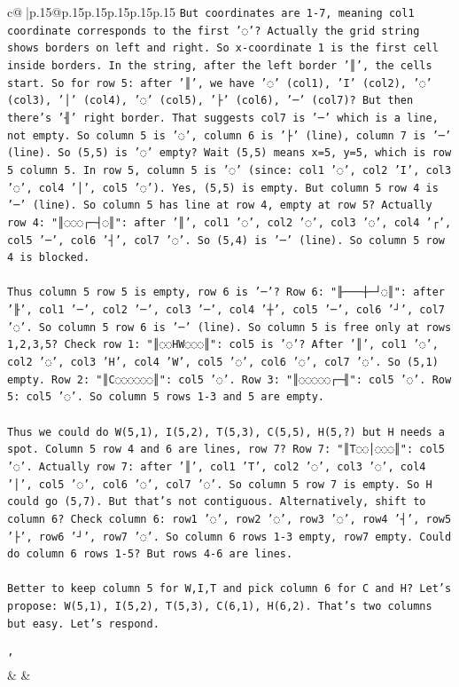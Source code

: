 \documentclass{article}
\begin{document}
{\begin{supertabular}{c@{$\;$}|p{.15\linewidth}@{}p{.15\linewidth}p{.15\linewidth}p{.15\linewidth}p{.15\linewidth}p{.15\linewidth}}
{{{\texttt{But coordinates are 1{-}7, meaning col1 coordinate corresponds to the first '◌'? Actually the grid string shows borders on left and right. So x{-}coordinate 1 is the first cell inside borders. In the string, after the left border '║', the cells start. So for row 5: after '║', we have '◌' (col1), 'I' (col2), '◌' (col3), '│' (col4), '◌' (col5), '├' (col6), '─' (col7)? But then there's '╢' right border. That suggests col7 is '─' which is a line, not empty. So column 5 is '◌', column 6 is '├' (line), column 7 is '─' (line). So (5,5) is '◌' empty? Wait (5,5) means x=5, y=5, which is row 5 column 5. In row 5, column 5 is '◌' (since: col1 '◌', col2 'I', col3 '◌', col4 '│', col5 '◌'). Yes, (5,5) is empty. But column 5 row 4 is '─' (line). So column 5 has line at row 4, empty at row 5? Actually row 4: "║◌◌◌┌─┤◌║": after '║', col1 '◌', col2 '◌', col3 '◌', col4 '┌', col5 '─', col6 '┤', col7 '◌'. So (5,4) is '─' (line). So column 5 row 4 is blocked.} \\
\\ 
\texttt{Thus column 5 row 5 is empty, row 6 is '─'? Row 6: "╟───┼─┘◌║": after '╟', col1 '─', col2 '─', col3 '─', col4 '┼', col5 '─', col6 '┘', col7 '◌'. So column 5 row 6 is '─' (line). So column 5 is free only at rows 1,2,3,5? Check row 1: "║◌◌HW◌◌◌║": col5 is '◌'? After '║', col1 '◌', col2 '◌', col3 'H', col4 'W', col5 '◌', col6 '◌', col7 '◌'. So (5,1) empty. Row 2: "║C◌◌◌◌◌◌║": col5 '◌'. Row 3: "║◌◌◌◌◌┌─╢": col5 '◌'. Row 5: col5 '◌'. So column 5 rows 1{-}3 and 5 are empty.} \\
\\ 
\texttt{Thus we could do W(5,1), I(5,2), T(5,3), C(5,5), H(5,?) but H needs a spot. Column 5 row 4 and 6 are lines, row 7? Row 7: "║T◌◌│◌◌◌║": col5 '◌'. Actually row 7: after '║', col1 'T', col2 '◌', col3 '◌', col4 '│', col5 '◌', col6 '◌', col7 '◌'. So column 5 row 7 is empty. So H could go (5,7). But that's not contiguous. Alternatively, shift to column 6? Check column 6: row1 '◌', row2 '◌', row3 '◌', row4 '┤', row5 '├', row6 '┘', row7 '◌'. So column 6 rows 1{-}3 empty, row7 empty. Could do column 6 rows 1{-}5? But rows 4{-}6 are lines.} \\
\\ 
\texttt{Better to keep column 5 for W,I,T and pick column 6 for C and H? Let's propose: W(5,1), I(5,2), T(5,3), C(6,1), H(6,2). That's two columns but easy. Let's respond.} \\
\\ 
\texttt{'} \\
            }
        }
    }
    & & \\ \\


\end{supertabular}}
\end{document}
